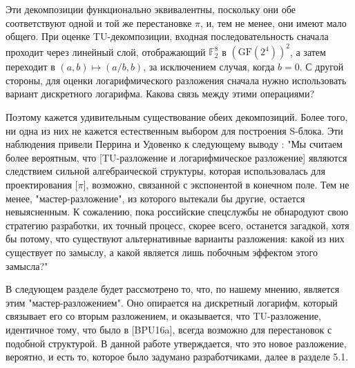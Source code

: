 Эти декомпозиции функционально эквивалентны, поскольку они обе соответствуют одной и той же перестановке \(\pi\), и, тем не менее, они имеют мало общего. При оценке TU-декомпозиции, входная последовательность сначала проходит через линейный слой, отображающий \(\mathbb{F}_2^8\) в \((\text{GF}(2^4))^2\), а затем переходит в \((a, b) \mapsto (a/b, b)\), за исключением случая, когда \(b = 0\). С другой стороны, для оценки логарифмического разложения сначала нужно использовать вариант дискретного логарифма. Какова связь между этими операциями?

Поэтому кажется удивительным существование обеих декомпозиций. Более того, ни одна из них не кажется естественным выбором для построения S-блока. Эти наблюдения привели Перрина и Удовенко к следующему выводу \cite{PU16}: "Мы считаем более вероятным, что [TU-разложение и логарифмическое разложение] являются следствием сильной алгебраической структуры, которая использовалась для проектирования [\(\pi\)], возможно, связанной с экспонентой в конечном поле. Тем не менее, "мастер-разложение", из которого вытекали бы другие, остается невыясненным. К сожалению, пока российские спецслужбы не обнародуют свою стратегию разработки, их точный процесс, скорее всего, останется загадкой, хотя бы потому, что существуют альтернативные варианты разложения: какой из них существует по замыслу, а какой является лишь побочным эффектом этого замысла?"

В следующем разделе будет рассмотрено то, что, по нашему мнению, является этим "мастер-разложением". Оно опирается на дискретный логарифм, который связывает его со вторым разложением, и оказывается, что TU-разложение, идентичное тому, что было в [BPU16a], всегда возможно для перестановок с подобной структурой. В данной работе утверждается, что это новое разложение, вероятно, и есть то, которое было задумано разработчиками, далее в разделе 5.1.